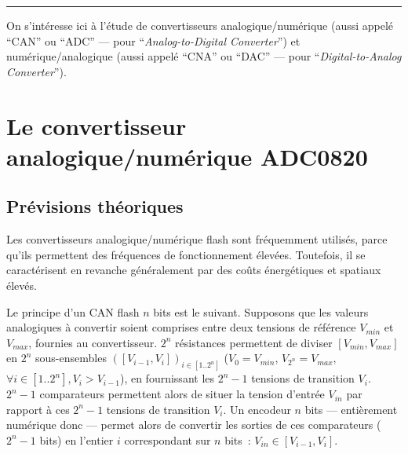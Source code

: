 \documentclass{article}
\begin{document}


\vspace{5pt}\hrule\vspace{2pt}


\vspace{20pt}


On s'intéresse ici à l'étude de convertisseurs analogique/numérique (aussi appelé ``CAN'' ou ``ADC'' --- pour ``\textit{Analog-to-Digital Converter}'') et numérique/analogique (aussi appelé ``CNA'' ou ``DAC'' --- pour ``\textit{Digital-to-Analog Converter}'').

\section{Le convertisseur analogique/numérique ADC0820}
\label{sec:ADC0820}

\subsection{Prévisions théoriques}


Les convertisseurs analogique/numérique flash sont fréquemment utilisés, %
 parce qu'ils permettent des fréquences de fonctionnement élevées. Toutefois, il se caractérisent en revanche généralement par des coûts énergétiques et spatiaux élevés.

Le principe d'un CAN flash $n$ bits est le suivant.
Supposons que les valeurs analogiques à convertir soient comprises entre deux tensions de référence $V_{min}$ et $V_{max}$, fournies au convertisseur. 
$2^n$ résistances permettent de diviser $[V_{min},V_{max}]$ en $2^n$ sous-ensembles $([V_{i-1},V_i])_{i\in[1..2^n]}$ ($V_0=V_{min}$, $V_{2^n}=V_{max}$, $\forall i\in[1..2^n], V_i> V_{i-1}$), en fournissant les $2^n-1$ tensions de transition $V_i$.
$2^n-1$ comparateurs permettent alors de situer la tension d'entrée $V_{in}$ par rapport à ces $2^n-1$ tensions de transition $V_i$.
Un encodeur $n$ bits --- entièrement numérique donc --- permet alors de convertir les sorties de ces comparateurs ($2^n-1$ bits) en l'entier $i$ correspondant sur $n$ bits~: $V_{in}\in[V_{i-1},V_i]$.
\end{document}
